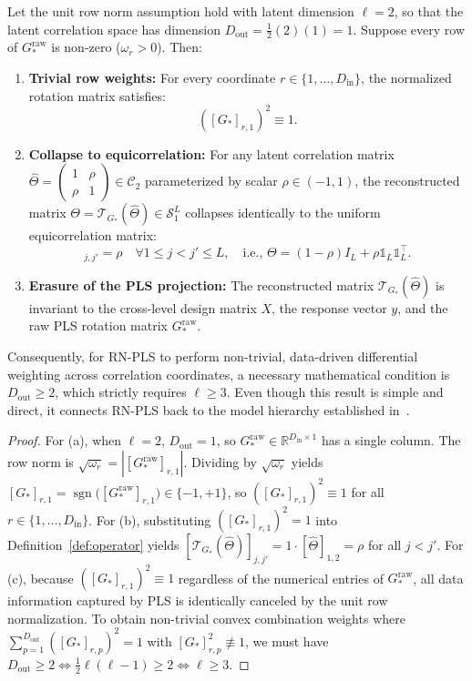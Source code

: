 \documentclass[default,sn-mathphys,Numbered]{sn-jnl}
\theoremstyle{thmstyleone}
\theoremstyle{thmstylethree}
\theoremstyle{thmstyletwo}
\newcommand{\inp}{\text{in}}
\newcommand{\outp}{\text{out}}
\begin{document}
Let the unit row norm assumption hold with latent dimension $\ell = 2$, so that the latent correlation space has dimension $D_{\outp} = \frac{1}{2}(2)(1) = 1$. Suppose every row of $G_*^{\mathrm{raw}}$ is non-zero ($\omega_r > 0$). Then:
\begin{enumerate}
    \item[(a)] \textbf{Trivial row weights:} For every coordinate $r \in \{1, \ldots, D_{\inp}\}$, the normalized rotation matrix satisfies:
    \begin{equation}
    \label{eq:l2_weight_trivial}
    \left([G_*]_{r, 1}\right)^2 \equiv 1.
    \end{equation}
    \item[(b)] \textbf{Collapse to equicorrelation:} For any latent correlation matrix $\hat{\Theta} = \begin{pmatrix} 1 & \rho \\ \rho & 1 \end{pmatrix} \in \mathcal{C}_2$ parameterized by scalar $\rho \in (-1, 1)$, the reconstructed matrix $\Theta = \mathcal{T}_{G_*}(\hat{\Theta}) \in \mathcal{S}_1^L$ collapses identically to the uniform equicorrelation matrix:
    \begin{equation}
    [\mathcal{T}_{G_*}(\hat{\Theta})]_{j, j'} = \rho \quad \forall 1 \le j < j' \le L, \quad \text{i.e., } \Theta = (1 - \rho) I_L + \rho \mathds{1}_L \mathds{1}_L^\top.
    \end{equation}
    \item[(c)] \textbf{Erasure of the PLS projection:} The reconstructed matrix $\mathcal{T}_{G_*}(\hat{\Theta})$ is invariant to the cross-level design matrix $X$, the response vector $y$, and the raw PLS rotation matrix $G_*^{\mathrm{raw}}$.
\end{enumerate}
Consequently, for RN-PLS to perform non-trivial, data-driven differential weighting across correlation coordinates, a necessary mathematical condition is $D_{\outp} \ge 2$, which strictly requires $\ell \ge 3$. Even though this result is simple and direct, it connects RN-PLS back to the model hierarchy established in~\citep{Mixed_Paul}.

\begin{proof}
For (a), when $\ell=2$, $D_{\outp}=1$, so $G_*^{\mathrm{raw}} \in \mathbb{R}^{D_{\inp} \times 1}$ has a single column. The row norm is $\sqrt{\omega_r} = |[G_*^{\mathrm{raw}}]_{r, 1}|$. Dividing by $\sqrt{\omega_r}$ yields $[G_*]_{r, 1} = \operatorname{sgn}\bigl([G_*^{\mathrm{raw}}]_{r, 1}\bigr) \in \{-1, +1\}$, so $([G_*]_{r, 1})^2 \equiv 1$ for all $r \in \{1, \ldots, D_{\inp}\}$.
For (b), substituting $([G_*]_{r, 1})^2 = 1$ into Definition~\ref{def:operator} yields $[\mathcal{T}_{G_*}(\hat{\Theta})]_{j, j'} = 1 \cdot [\hat{\Theta}]_{1, 2} = \rho$ for all $j < j'$.
For (c), because $([G_*]_{r, 1})^2 \equiv 1$ regardless of the numerical entries of $G_*^{\mathrm{raw}}$, all data information captured by PLS is identically canceled by the unit row normalization. To obtain non-trivial convex combination weights where $\sum_{p=1}^{D_{\outp}} ([G_*]_{r, p})^2 = 1$ with $[G_*]_{r, p}^2 \not\equiv 1$, we must have $D_{\outp} \ge 2 \iff \frac{1}{2}\ell(\ell-1) \ge 2 \iff \ell \ge 3$.
\end{proof}
\end{document}
